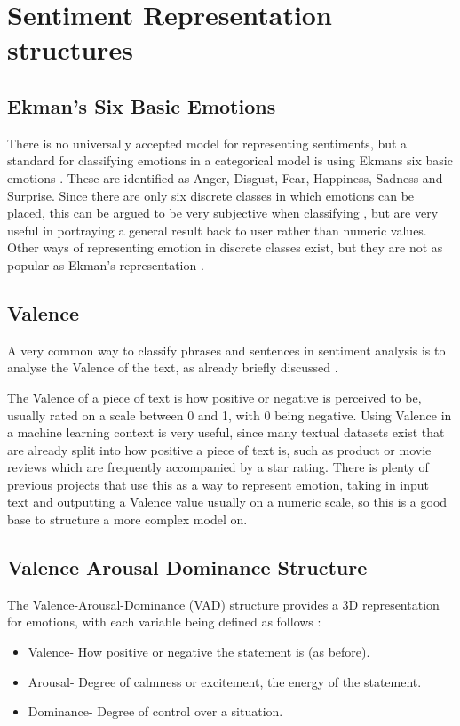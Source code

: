 
\section{Sentiment Representation structures}

\subsection{Ekman's Six Basic Emotions}

There is no universally accepted model for representing sentiments, but a standard for classifying emotions in a categorical model is using Ekmans six basic emotions \cite{Ekman}. These are identified as Anger, Disgust, Fear, Happiness, Sadness and Surprise. Since there are only six discrete classes in which emotions can be placed, this can be argued to be very subjective when classifying \cite{emoBank}, but are very useful in portraying a general result back to user rather than numeric values. Other ways of representing emotion in discrete classes exist, but they are not as popular as Ekman's representation \cite{izard1993stability}.

\subsection{Valence}
A very common way to classify phrases and sentences in sentiment analysis is to analyse the Valence of the text, as already briefly discussed \cite{frijda1986emotions}.

The Valence of a piece of text is how positive or negative is perceived to be, usually rated on a scale between 0 and 1, with 0 being negative.
Using Valence in a machine learning context is very useful, since many textual datasets exist that are already split into how positive a piece of text is, such as product or movie reviews which are frequently accompanied by a star rating. There is plenty of previous projects that use this as a way to represent emotion, taking in input text and outputting a Valence value usually on a numeric scale, so this is a good base to structure a more complex model on.

\subsection{Valence Arousal Dominance Structure}

The Valence-Arousal-Dominance (VAD) structure provides a 3D representation for emotions, with each variable being defined as follows \cite{VAD}:
\begin{itemize}
    \item Valence- How positive or negative the statement is (as before).
    \item Arousal- Degree of calmness or excitement, the energy of the statement. 
    \item Dominance- Degree of control over a situation.
\end{itemize}

